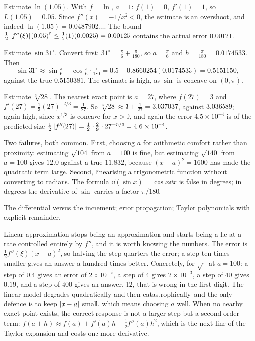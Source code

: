 \begin{worked}
Estimate $\ln(1.05)$. With $f=\ln$, $a=1$: $f(1)=0$, $f'(1)=1$, so $L(1.05)=0.05$. Since $f''(x)=-1/x^{2}<0$, the estimate is an overshoot, and indeed $\ln(1.05)=0.0487902\ldots$. The bound $\tfrac12\left\lvert f''(\xi)\right\rvert(0.05)^{2}\leq\tfrac12(1)(0.0025)=0.00125$ contains the actual error $0.00121$.

Estimate $\sin31^{\circ}$. Convert first: $31^{\circ}=\tfrac{\pi}{6}+\tfrac{\pi}{180}$, so $a=\tfrac{\pi}{6}$ and $h=\tfrac{\pi}{180}=0.0174533$. Then
\[\sin31^{\circ}\approx\sin\tfrac{\pi}{6}+\cos\tfrac{\pi}{6}\cdot\tfrac{\pi}{180}=0.5+0.8660254(0.0174533)=0.5151150,\]
against the true $0.5150381$. The estimate is high, as $\sin$ is concave on $(0,\pi)$.

Estimate $\sqrt[3]{28}$. The nearest exact point is $a=27$, where $f(27)=3$ and $f'(27)=\tfrac13(27)^{-2/3}=\tfrac{1}{27}$. So $\sqrt[3]{28}\approx3+\tfrac{1}{27}=3.037037$, against $3.036589$; again high, since $x^{1/3}$ is concave for $x>0$, and again the error $4.5\times10^{-4}$ is of the predicted size $\tfrac12\left\lvert f''(27)\right\rvert=\tfrac12\cdot\tfrac{2}{9}\cdot27^{-5/3}=4.6\times10^{-4}$.
\end{worked}

\begin{trap}
Two failures, both common. First, choosing $a$ for arithmetic comfort rather than proximity: estimating $\sqrt{104}$ from $a=100$ is fine, but estimating $\sqrt{140}$ from $a=100$ gives $12.0$ against a true $11.832$, because $(x-a)^{2}=1600$ has made the quadratic term large. Second, linearising a trigonometric function without converting to radians. The formula $\dd(\sin x)=\cos x\dd x$ is false in degrees; in degrees the derivative of $\sin$ carries a factor $\pi/180$.
\end{trap}

\begin{seealsob}The differential versus the increment; error propagation; Taylor polynomials with explicit remainder.\end{seealsob}

Linear approximation stops being an approximation and starts being a lie at a rate controlled entirely by $f''$, and it is worth knowing the numbers. The error is $\tfrac12f''(\xi)(x-a)^{2}$, so halving the step quarters the error; a step ten times smaller gives an answer a hundred times better. Concretely, for $\sqrt{\cdot}$ at $a=100$: a step of $0.4$ gives an error of $2\times10^{-5}$, a step of $4$ gives $2\times10^{-3}$, a step of $40$ gives $0.19$, and a step of $400$ gives an answer, $12$, that is wrong in the first digit. The linear model degrades quadratically and then catastrophically, and the only defence is to keep $\left\lvert x-a\right\rvert$ small, which means choosing $a$ well. When no nearby exact point exists, the correct response is not a larger step but a second-order term: $f(a+h)\approx f(a)+f'(a)h+\tfrac12f''(a)h^{2}$, which is the next line of the Taylor expansion and costs one more derivative.

